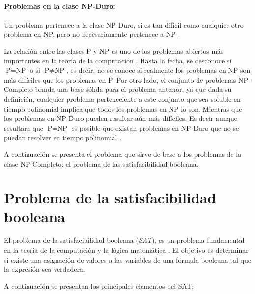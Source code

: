 \documentclass[12pt]{article}
\begin{document}
\paragraph{Problemas en la clase NP-Duro:}
Un problema pertenece a la clase NP-Duro, si es tan difícil como cualquier otro problema en NP, pero no necesariamente pertenece a NP \cite{authomataTheory}. 

La relación entre las clases P y NP es uno de los problemas abiertos más importantes en la teoría de la 
computación \cite{authomataTheory}. Hasta la fecha, se desconoce si $\text{P} = \text{NP}$ o si $\text{P}
  \neq \text{NP}$, es decir, no se conoce si realmente los problemas en NP son más difíciles que los problemas en 
P. Por otro lado, el conjunto de problemas NP-Completo brinda una base sólida para el problema anterior, ya 
que dada su definición, cualquier problema perteneciente a este conjunto que sea soluble en tiempo polinomial 
implica que todos los problemas en NP lo son. Mientras que los problemas en NP-Duro pueden resultar aún más 
difíciles. Es decir aunque resultara que $\text{P} = \text{NP}$ es posible que existan problemas en NP-Duro que no se puedan resolver en tiempo polinomial \cite{authomataTheory}.

A continuación se presenta el problema que sirve de base a los problemas de la clase NP-Completo: el problema de las satisfacibilidad
booleana.

\section{Problema de la satisfacibilidad booleana}

El problema de la satisfacibilidad booleana (\textit{SAT}), es un problema fundamental en la teoría de la computación y la lógica matemática \cite{authomataTheory}. El objetivo es determinar si existe una asignación de valores a las variables de una fórmula booleana tal que la expresión sea verdadera.

A continuación se presentan los principales elementos del SAT:
\end{document}
